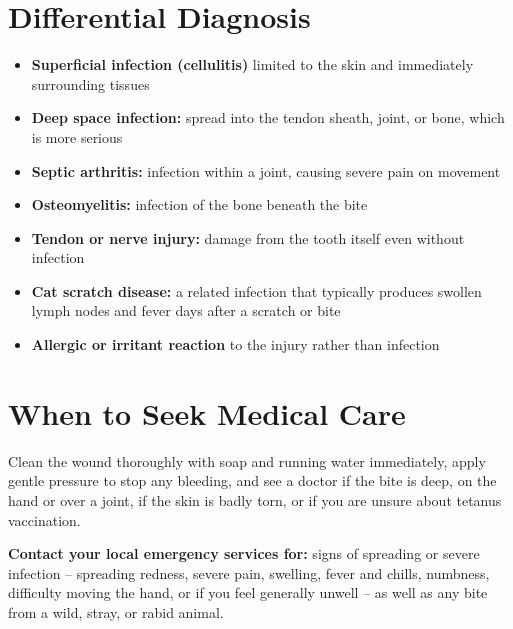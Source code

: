 \section*{Differential Diagnosis}
\begin{itemize}
    \item \textbf{Superficial infection (cellulitis)} limited to the skin and immediately surrounding tissues
    \item \textbf{Deep space infection:} spread into the tendon sheath, joint, or bone, which is more serious
    \item \textbf{Septic arthritis:} infection within a joint, causing severe pain on movement
    \item \textbf{Osteomyelitis:} infection of the bone beneath the bite
    \item \textbf{Tendon or nerve injury:} damage from the tooth itself even without infection
    \item \textbf{Cat scratch disease:} a related infection that typically produces swollen lymph nodes and fever days after a scratch or bite
    \item \textbf{Allergic or irritant reaction} to the injury rather than infection
\end{itemize}

\section*{When to Seek Medical Care}
Clean the wound thoroughly with soap and running water immediately, apply gentle pressure to stop any bleeding, and see a doctor if the bite is deep, on the hand or over a joint, if the skin is badly torn, or if you are unsure about tetanus vaccination.

\textbf{Contact your local emergency services for:} signs of spreading or severe infection -- spreading redness, severe pain, swelling, fever and chills, numbness, difficulty moving the hand, or if you feel generally unwell -- as well as any bite from a wild, stray, or rabid animal.

